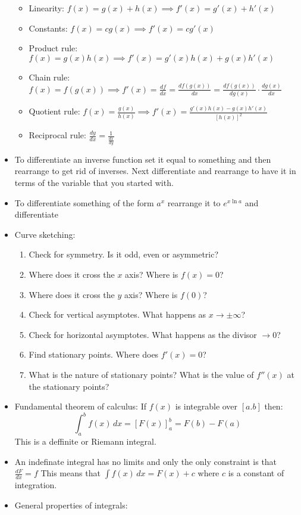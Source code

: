 \documentclass{article}
\begin{document}
\begin{itemize}
\begin{itemize}
\item Linearity:		\(f(x)=g(x)+h(x)\implies f'(x)=g'(x)+h'(x)\)
\item Constants:		\(f(x)=cg(x)\implies f'(x)=cg'(x)\)
\item Product rule:	\(f(x)=g(x)h(x)\implies f'(x)=g'(x)h(x)+g(x)h'(x)\)
\item Chain rule:		\(f(x)=f(g(x))\implies f'(x)=\frac{df}{dx}=\frac{df(g(x))}{dx}=\frac{df(g(x))}{dg(x)}\cdot\frac{dg(x)}{dx}\)
\item Quotient rule:	\(f(x)=\frac{g(x)}{h(x)}\implies f'(x)=\frac{g'(x)h(x)-g(x)h'(x)}{[h(x)]^2}\)
\item Reciprocal rule:	\(\frac{dy}{dx}=\frac{1}{\frac{dx}{dy}}\)
\end{itemize}
\item To differentiate an inverse function set it equal to something and then rearrange to get rid of inverses. Next differentiate and rearrange to have it in terms of the variable that you started with.
\item To differentiate something of the form \(a^x\) rearrange it to \(e^{x\ln a}\) and differentiate
\item Curve sketching:
\begin{enumerate}
\item Check for symmetry. Is it odd, even or asymmetric?
\item Where does it cross the \(x\) axis? Where is \(f(x)=0\)?
\item Where does it cross the \(y\) axis? Where is \(f(0)\)?
\item Check for vertical asymptotes. What happens as \(x \to \pm \infty\)?
\item Check for horizontal asymptotes. What happens as the divisor \(\to 0\)?
\item Find stationary points. Where does \(f'(x)=0\)?
\item What is the nature of stationary points? What is the value of \(f''(x)\) at the stationary points?
\end{enumerate}
\item Fundamental theorem of calculus:	If \(f(x)\) is integrable over \([a.b]\) then:
\[\int_a^bf(x)\,dx=[F(x)]_a^b=F(b)-F(a)\]
This is a deffinite or Riemann integral.
\item An indefinate integral has no limits and only the only constraint is that \(\frac{dF}{dx}=f\) This means that \(\int f(x)\,dx=F(x)+c\) where \(c\) is a constant of integration.
\item General properties of integrals:

\end{itemize}
\end{document}
